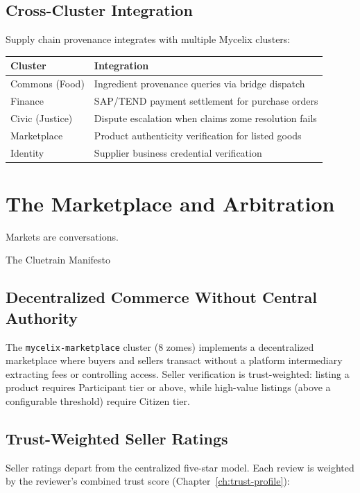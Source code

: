 \documentclass[12pt]{book}
\begin{document}
\section{Cross-Cluster Integration}

Supply chain provenance integrates with multiple Mycelix clusters:

\begin{longtable}{lp{8cm}}
\toprule
\textbf{Cluster} & \textbf{Integration} \\
\midrule
\endhead
Commons (Food)   & Ingredient provenance queries via bridge dispatch \\
Finance          & SAP/TEND payment settlement for purchase orders \\
Civic (Justice)  & Dispute escalation when claims zome resolution fails \\
Marketplace      & Product authenticity verification for listed goods \\
Identity         & Supplier business credential verification \\
\bottomrule
\end{longtable}


\chapter{The Marketplace and Arbitration}
\label{ch:marketplace}

\epigraph{Markets are conversations.}{The Cluetrain Manifesto}

\section{Decentralized Commerce Without Central Authority}

The \texttt{mycelix-marketplace} cluster (8 zomes) implements a
decentralized marketplace where buyers and sellers transact without
a platform intermediary extracting fees or controlling access.  Seller
verification is trust-weighted: listing a product requires Participant
tier or above, while high-value listings (above a configurable
threshold) require Citizen tier.

\section{Trust-Weighted Seller Ratings}

Seller ratings depart from the centralized five-star model.  Each
review is weighted by the reviewer's combined trust score
(Chapter~\ref{ch:trust-profile}):
\end{document}
